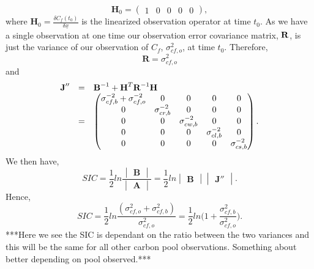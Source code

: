 \documentclass[11pt]{article}
\begin{document}
\[
\textbf{H}_{0} = \begin{pmatrix}
1 & 0 & 0 & 0 & 0
\end{pmatrix},
\] 
where $\textbf{H}_{0}=\frac{\delta C_f(t_0)}{\delta\underline{x}}$ is the linearized observation operator at time $t_0$. As we have a single observation at one time our observation error covariance matrix, $\bf{R}$, is just the variance of our observation of $C_f$, $\sigma_{cf,o}^{2}$, at time $t_0$. Therefore,
\[
\textbf{R}=\sigma_{cf,o}^{2}
\]  
and
\[
\begin{array} {lcl}
\textbf{J}'' &=& \textbf{B}^{-1}+\textbf{H}^{T}\textbf{R}^{-1}\bf{H} \\
&=& \begin{pmatrix} 
\sigma_{cf,b}^{-2}+\sigma_{cf,o}^{-2} & 0 & 0 & 0 & 0 \\
0 & \sigma_{cr,b}^{-2} & 0 & 0 & 0 \\
0 & 0 & \sigma_{cw,b}^{-2} & 0 & 0 \\
0 & 0 & 0 & \sigma_{cl,b}^{-2} & 0 \\
0 & 0 & 0 & 0 & \sigma_{cs,b}^{-2} \\
\end{pmatrix}.
\end{array}
\] 
We then have,
\[
SIC=\frac{1}{2}ln\frac{\begin{vmatrix} \textbf{B} \end{vmatrix}}{\begin{vmatrix} \textbf{A} \end{vmatrix}} = \frac{1}{2}ln\begin{vmatrix} \textbf{B} \end{vmatrix}\begin{vmatrix} \textbf{J}'' \end{vmatrix}.
\]
Hence,
\[
SIC = \frac{1}{2}ln\frac{(\sigma_{cf,o}^{2}+\sigma_{cf,b}^{2})}{\sigma_{cf,o}^{2}}
=\frac{1}{2}ln \bigg(1+\frac{\sigma_{cf,b}^{2}}{\sigma_{cf,o}^{2}}\bigg).
\]
***Here we see the SIC is dependant on the ratio between the two variances and this will be the same for all other carbon pool observations. Something about better depending on pool observed.*** 
\end{document}
